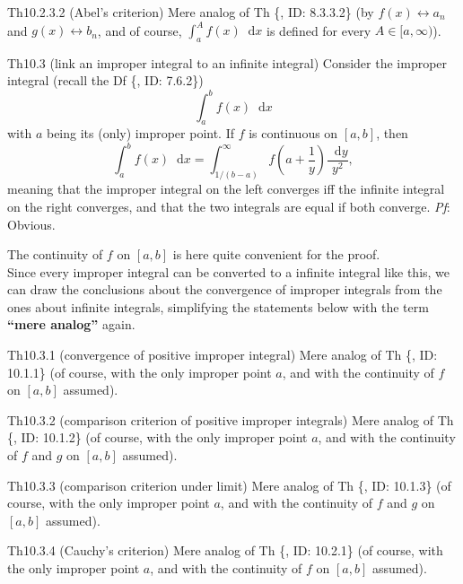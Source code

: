 \documentclass{article}
\newcommand{\dif}{\mathop{}\!\mathrm{d}}
\begin{document}
\begin{Th}{Th10.2.3.2 (Abel's criterion)}
    Mere analog of Th \{, ID: 8.3.3.2\} (by $f(x) \leftrightarrow a_n$ and $g(x) \leftrightarrow b_n$, and of course, $\int_a^A f(x)\dif x$ is defined for every $A\in [a, \infty)$).
\end{Th}

\begin{Th}{Th10.3 (link an improper integral to an infinite integral)}
    Consider the improper integral (recall the Df \{, ID: 7.6.2\})
    $$\int_a^b f(x)\dif x$$
    with $a$ being its (only) improper point. If $f$ is continuous on $[a, b]$, then
    $$\int_a^b f(x)\dif x = \int_{1/(b-a)}^\infty f(a+\frac{1}{y})\frac{\dif y}{y^2}, $$
    meaning that the improper integral on the left converges iff the infinite integral on the right converges, and that the two integrals are equal if both converge.
    \tcblower
    \textit{Pf}: Obvious.
\end{Th}

\begin{Rmk}{}
    The continuity of $f$ on $[a, b]$ is here quite convenient for the proof. \\
    Since every improper integral can be converted to a infinite integral like this, we can draw the conclusions about the convergence of improper integrals from the ones about infinite integrals, simplifying the statements below with the term \textbf{``mere analog''} again.
\end{Rmk}

\begin{Th}{Th10.3.1 (convergence of positive improper integral)}
    Mere analog of Th \{, ID: 10.1.1\} (of course, with the only improper point $a$, and with the continuity of $f$ on $[a, b]$ assumed).
\end{Th}

\begin{Th}{Th10.3.2 (comparison criterion of positive improper integrals)}
    Mere analog of Th \{, ID: 10.1.2\} (of course, with the only improper point $a$, and with the continuity of $f$ and $g$ on $[a, b]$ assumed).
\end{Th}

\begin{Th}{Th10.3.3 (comparison criterion under limit)}
    Mere analog of Th \{, ID: 10.1.3\} (of course, with the only improper point $a$, and with the continuity of $f$ and $g$ on $[a, b]$ assumed).
\end{Th}

\begin{Th}{Th10.3.4 (Cauchy's criterion)}
    Mere analog of Th \{, ID: 10.2.1\} (of course, with the only improper point $a$, and with the continuity of $f$ on $[a, b]$ assumed).
\end{Th}
\end{document}
